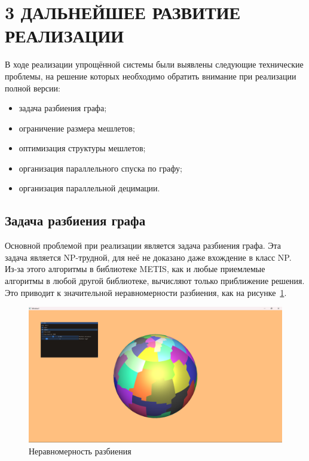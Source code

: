 \clearpage
\section{3 ДАЛЬНЕЙШЕЕ РАЗВИТИЕ РЕАЛИЗАЦИИ}
В ходе реализации упрощённой системы были выявлены следующие технические проблемы, на решение которых необходимо обратить внимание при реализации полной версии:
\begin{itemize}
    \item задача разбиения графа;
    \item ограничение размера мешлетов;
    \item оптимизация структуры мешлетов;
    \item организация параллельного спуска по графу;
    \item организация параллельной децимации.
\end{itemize}

\subsection*{Задача разбиения графа}
Основной проблемой при реализации является задача разбиения графа.
Эта задача является NP-трудной, для неё не доказано даже вхождение в класс NP.
Из-за этого алгоритмы в библиотеке METIS, как и любые приемлемые алгоритмы в любой другой библиотеке, вычисляют только приближение решения.
Это приводит к значительной неравномерности разбиения, как на рисунке~\ref{fig:sphere-0}.
\begin{figure}[H]
    \centering
    \includegraphics[width=\textwidth]{pics/sphere0.png}
    \caption{Неравномерность разбиения}
    \label{fig:sphere-0}
\end{figure}

